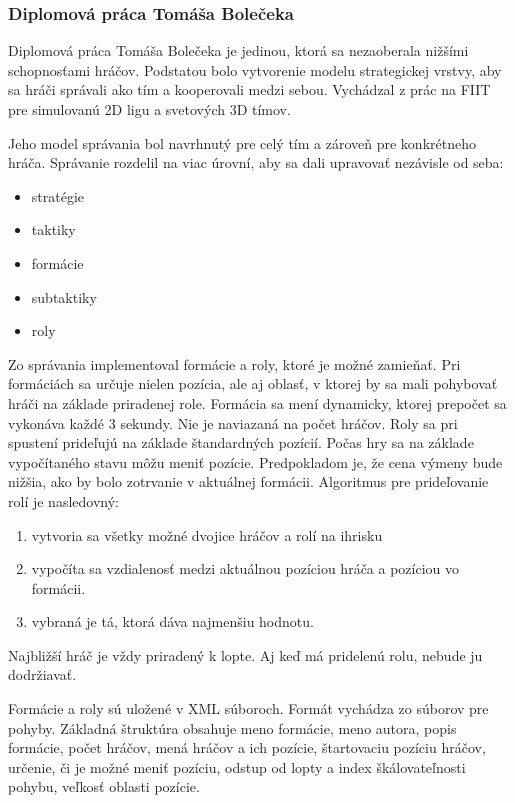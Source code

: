 

\subsubsection{Diplomová práca Tomáša Bolečeka}
Diplomová práca Tomáša Bolečeka \cite{bolecek} je jedinou, ktorá sa nezaoberala nižšími schopnosťami hráčov. Podstatou bolo vytvorenie modelu strategickej vrstvy, aby sa hráči správali ako tím a kooperovali medzi sebou. Vychádzal z prác na FIIT pre simulovanú 2D ligu a svetových 3D tímov. 

Jeho model správania bol navrhnutý pre celý tím a zároveň pre konkrétneho hráča. Správanie rozdelil na viac úrovní, aby sa dali upravovať nezávisle od seba:
\begin{itemize}
\item stratégie
\item taktiky
\item formácie
\item subtaktiky
\item roly
\end{itemize}
Zo správania implementoval formácie a roly, ktoré je možné zamieňať. Pri formáciách sa určuje nielen pozícia, ale aj oblasť, v ktorej by sa mali pohybovať hráči na základe priradenej role. Formácia sa mení dynamicky, ktorej prepočet sa vykonáva každé 3 sekundy. Nie je naviazaná na počet hráčov. Roly sa pri spustení prideľujú na základe štandardných pozícií. Počas hry sa na základe vypočítaného stavu môžu meniť pozície. Predpokladom je, že cena výmeny bude nižšia, ako by bolo zotrvanie v aktuálnej formácii. Algoritmus pre prideľovanie rolí je nasledovný:
\begin{enumerate}
\item vytvoria sa všetky možné dvojice hráčov a rolí na ihrisku
\item vypočíta sa vzdialenosť medzi aktuálnou pozíciou hráča a pozíciou vo formácii.
\item vybraná je tá, ktorá dáva najmenšiu hodnotu.
\end{enumerate}
Najbližší hráč je vždy priradený k lopte. Aj keď má pridelenú rolu, nebude ju dodržiavať. %

Formácie a roly sú uložené v XML súboroch. Formát vychádza zo súborov pre pohyby. Základná štruktúra obsahuje meno formácie, meno autora, popis formácie, počet hráčov, mená hráčov a ich pozície, štartovaciu pozíciu hráčov, určenie, či je možné meniť pozíciu, odstup od lopty a index škálovateľnosti pohybu, veľkosť oblasti pozície.


